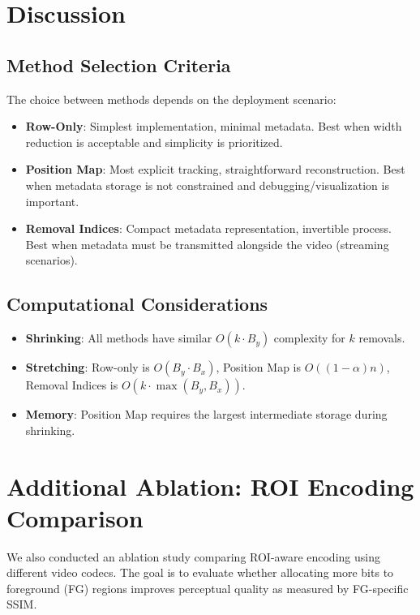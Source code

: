\documentclass[11pt,a4paper]{article}
\begin{document}
\section{Discussion}

\subsection{Method Selection Criteria}

The choice between methods depends on the deployment scenario:

\begin{itemize}
    \item \textbf{Row-Only}: Simplest implementation, minimal metadata. Best when width reduction is acceptable and simplicity is prioritized.
    
    \item \textbf{Position Map}: Most explicit tracking, straightforward reconstruction. Best when metadata storage is not constrained and debugging/visualization is important.
    
    \item \textbf{Removal Indices}: Compact metadata representation, invertible process. Best when metadata must be transmitted alongside the video (streaming scenarios).
\end{itemize}

\subsection{Computational Considerations}

\begin{itemize}
    \item \textbf{Shrinking}: All methods have similar $O(k \cdot B_y)$ complexity for $k$ removals.
    \item \textbf{Stretching}: Row-only is $O(B_y \cdot B_x)$, Position Map is $O((1-\alpha)n)$, Removal Indices is $O(k \cdot \max(B_y, B_x))$.
    \item \textbf{Memory}: Position Map requires the largest intermediate storage during shrinking.
\end{itemize}

\section{Additional Ablation: ROI Encoding Comparison}

We also conducted an ablation study comparing ROI-aware encoding using different video codecs. The goal is to evaluate whether allocating more bits to foreground (FG) regions improves perceptual quality as measured by FG-specific SSIM.
\end{document}
